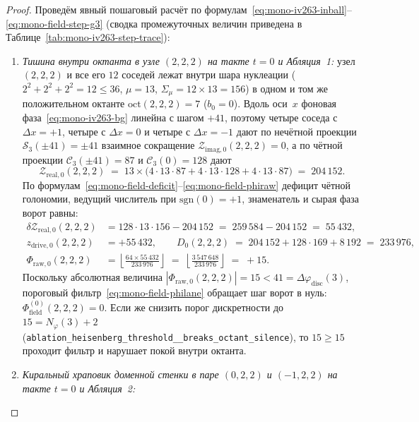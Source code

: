 \begin{proof}
Проведём явный пошаговый расчёт по формулам~\eqref{eq:mono-iv263-inball}--\eqref{eq:mono-field-step-g3} (сводка промежуточных величин приведена в Таблице~\ref{tab:mono-iv263-step-trace}):
\begin{enumerate}[label=\textbf{\arabic*.},leftmargin=*]
\item \emph{Тишина внутри октанта в узле $(2, 2, 2)$ на такте $t = 0$ и Абляция~1:}
  узел $(2,2,2)$ и все его $12$ соседей лежат внутри шара нуклеации ($2^2+2^2+2^2 = 12 \le 36$, $\mu = 13$, $\Sigma_\mu = 12\times 13 = 156$) в одном и том же положительном октанте $\mathrm{oct}(2,2,2) = 7$ ($b_0 = 0$). Вдоль оси~$x$ фоновая фаза~\eqref{eq:mono-iv263-bg} линейна с шагом $+41$, поэтому четыре соседа с $\Delta x = +1$, четыре с $\Delta x = 0$ и четыре с $\Delta x = -1$ дают по нечётной проекции $\mathcal{S}_3(\pm 41) = \pm 41$ взаимное сокращение $\mathcal{Z}_{\mathrm{imag},0}(2,2,2) = 0$, а по чётной проекции $\mathcal{C}_3(\pm 41) = 87$ и $\mathcal{C}_3(0) = 128$ дают
  \[
    \mathcal{Z}_{\mathrm{real},0}(2,2,2) \;=\; 13 \times \bigl(4\cdot 13\cdot 87 + 4\cdot 13\cdot 128 + 4\cdot 13\cdot 87\bigr) \;=\; 204\,152.
  \]
  По формулам~\eqref{eq:mono-field-deficit}--\eqref{eq:mono-field-phiraw} дефицит чётной голономии, ведущий числитель при $\mathrm{sgn}(0) = +1$, знаменатель и сырая фаза ворот равны:
  \begin{align*}
    \delta\mathcal{Z}_{\mathrm{real},0}(2,2,2) &= 128 \cdot 13 \cdot 156 - 204\,152 \;=\; 259\,584 - 204\,152 \;=\; 55\,432, \\
    z_{\mathrm{drive},0}(2,2,2) &= +55\,432, \qquad
    D_0(2,2,2) \;=\; 204\,152 + 128\cdot 169 + 8\,192 \;=\; 233\,976, \\
    \Phi_{\mathrm{raw},0}(2,2,2) &= \left\lfloor \frac{64 \times 55\,432}{233\,976} \right\rfloor \;=\; \left\lfloor \frac{3\,547\,648}{233\,976} \right\rfloor \;=\; +15.
  \end{align*}
  Поскольку абсолютная величина $|\Phi_{\mathrm{raw},0}(2,2,2)| = 15 < 41 = \Delta\varphi_{\mathrm{disc}}(3)$, пороговый фильтр~\eqref{eq:mono-field-philane} обращает шаг ворот в нуль: $\Phi_{\mathrm{field}}^{(0)}(2,2,2) = 0$. Если же снизить порог дискретности до $15 = N_\varphi(3) + 2$ (\texttt{ablation\_\allowbreak heisenberg\_\allowbreak threshold\_\_\allowbreak breaks\_\allowbreak octant\_\allowbreak silence}), то $15 \ge 15$ проходит фильтр и нарушает покой внутри октанта.
\item \emph{Киральный храповик доменной стенки в паре $(0, 2, 2)$ и $(-1, 2, 2)$ на такте $t = 0$ и Абляция~2:}

\end{enumerate}
\end{proof}
